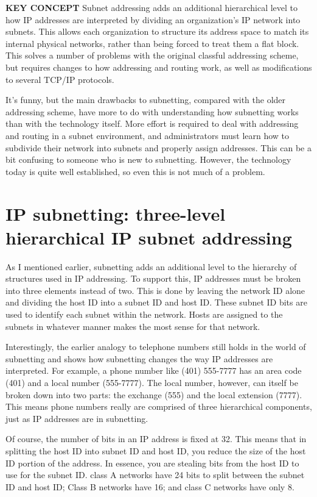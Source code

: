 {\textbf{KEY CONCEPT}} Subnet addressing adds an additional hierarchical
level to how IP addresses are interpreted by dividing an organization's
IP network into subnets. This allows each organization to structure its
address space to match its internal physical networks, rather than being
forced to treat them a flat block. This solves a number of problems with
the original classful addressing scheme, but requires changes to how
addressing and routing work, as well as modifications to several TCP/IP
protocols.

It's funny, but the main drawbacks to subnetting, compared with the
older addressing scheme, have more to do with understanding how
subnetting works than with the technology itself. More effort is
required to deal with addressing and routing in a subnet environment,
and administrators must learn how to subdivide their network into
subnets and properly assign addresses. This can be a bit confusing to
someone who is new to subnetting. However, the technology today is quite
well established, so even this is not much of a problem.


\section{IP subnetting: three-level hierarchical IP subnet addressing}

As I mentioned earlier, subnetting adds an additional level to the hierarchy
of structures used in IP addressing. To support this, IP addresses must
be broken into three elements instead of two. This is done by leaving
the network ID alone and dividing the host ID into a subnet ID and host
ID. These subnet ID bits are used to identify each subnet within the
network. Hosts are assigned to the subnets in whatever manner makes the
most sense for that network.

Interestingly, the earlier analogy to telephone numbers still holds in
the world of subnetting and shows how subnetting changes the way IP
addresses are interpreted. For example, a phone number like (401)
555-7777 has an area code (401) and a local number (555-7777). The local
number, however, can itself be broken down into two parts: the exchange
(555) and the local extension (7777). This means phone numbers really
are comprised of three hierarchical components, just as IP addresses are
in subnetting.

Of course, the number of bits in an IP address is fixed at 32. This
means that in splitting the host ID into subnet ID and host ID, you
reduce the size of the host ID portion of the address. In essence, you
are stealing bits from the host ID to use for the subnet ID. class A
networks have 24 bits to split between the subnet ID and host ID; Class
B networks have 16; and class C networks have only 8.


